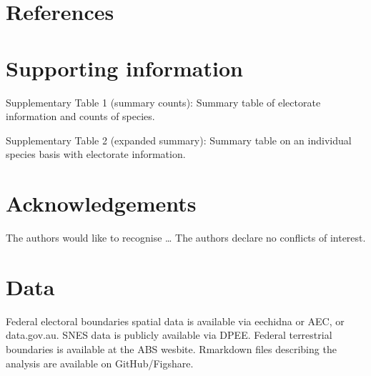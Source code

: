 \documentclass[a4paper,11pt]{article}
\begin{document}
\newpage
\nolinenumbers
\section{References}
\printbibliography

\newpage
\section{Supporting information}

Supplementary Table 1 (summary counts): Summary table of electorate information and counts of species.

Supplementary Table 2 (expanded summary): Summary table on an individual species basis with electorate information.

\newpage
\section{Acknowledgements}
The authors would like to recognise \ldots
The authors declare no conflicts of interest.

\newpage
\section{Data}
Federal electoral boundaries spatial data is available via eechidna or AEC, or data.gov.au.
SNES data is publicly available via DPEE.
Federal terrestrial boundaries is available at the ABS wesbite.
Rmarkdown files describing the analysis are available on GitHub/Figshare.
\end{document}
